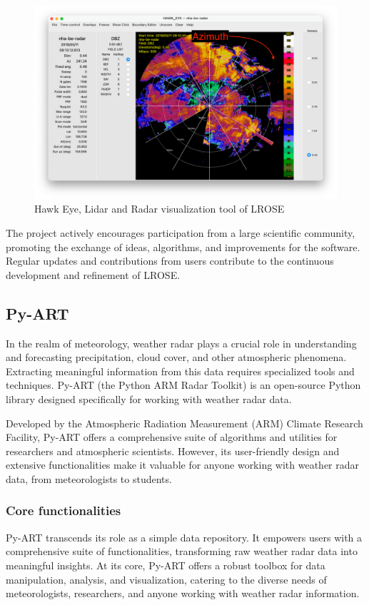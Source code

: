 \begin{figure}[H]
    \centering
    \includegraphics[width=0.8\linewidth]{Images/3.5-hawk-eye.png}
    \caption{Hawk Eye, Lidar and Radar visualization tool of LROSE}
    \label{fig:hawk-eye}
\end{figure}

The project actively encourages participation from a large scientific community,
promoting the exchange of ideas, algorithms, and improvements for the software.
Regular updates and contributions from users contribute to the continuous
development and refinement of LROSE.


\subsection{Py-ART}
In the realm of meteorology, weather radar plays a crucial role in understanding
and forecasting precipitation, cloud cover, and other atmospheric phenomena.
Extracting meaningful information from this data requires specialized tools and
techniques. Py-ART (the Python ARM Radar Toolkit) is an open-source Python
library designed specifically for working with weather radar data.

Developed by the Atmospheric Radiation Measurement (ARM) Climate Research
Facility, Py-ART offers a comprehensive suite of algorithms and utilities for
researchers and atmospheric scientists. However, its user-friendly design and
extensive functionalities make it valuable for anyone working with weather radar
data, from meteorologists to students.

\subsubsection*{Core functionalities}
Py-ART transcends its role as a simple data repository. It empowers users with a
comprehensive suite of functionalities, transforming raw weather radar data into
meaningful insights.  At its core, Py-ART offers a robust toolbox for data
manipulation, analysis, and visualization, catering to the diverse needs of
meteorologists, researchers, and anyone working with weather radar information.

